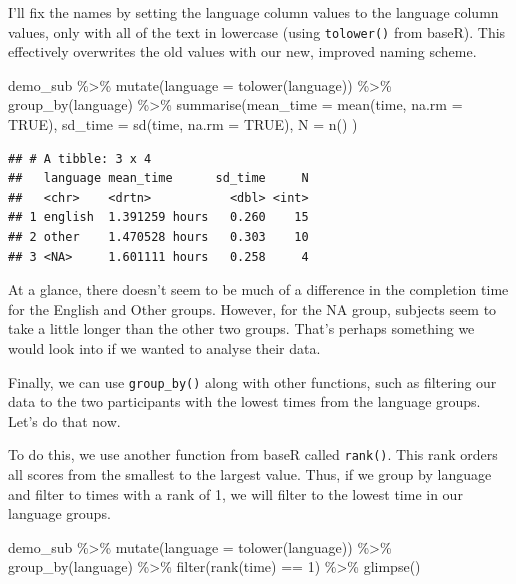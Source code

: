 \documentclass[
]{book}
\newenvironment{Shaded}{\begin{snugshade}}{\end{snugshade}}
\newcommand{\AttributeTok}[1]{\textcolor[rgb]{0.77,0.63,0.00}{#1}}
\newcommand{\ConstantTok}[1]{\textcolor[rgb]{0.00,0.00,0.00}{#1}}
\newcommand{\DecValTok}[1]{\textcolor[rgb]{0.00,0.00,0.81}{#1}}
\newcommand{\FunctionTok}[1]{\textcolor[rgb]{0.00,0.00,0.00}{#1}}
\newcommand{\NormalTok}[1]{#1}
\newcommand{\SpecialCharTok}[1]{\textcolor[rgb]{0.00,0.00,0.00}{#1}}
\begin{document}
I'll fix the names by setting the language column values to the language column values, only with all of the text in lowercase (using \texttt{tolower()} from baseR). This effectively overwrites the old values with our new, improved naming scheme.

\begin{Shaded}
\begin{Highlighting}[]
\NormalTok{demo\_sub }\SpecialCharTok{\%\textgreater{}\%} 
  \FunctionTok{mutate}\NormalTok{(}\AttributeTok{language =} \FunctionTok{tolower}\NormalTok{(language)) }\SpecialCharTok{\%\textgreater{}\%}
  \FunctionTok{group\_by}\NormalTok{(language) }\SpecialCharTok{\%\textgreater{}\%}
  \FunctionTok{summarise}\NormalTok{(}\AttributeTok{mean\_time =} \FunctionTok{mean}\NormalTok{(time, }\AttributeTok{na.rm =} \ConstantTok{TRUE}\NormalTok{),}
           \AttributeTok{sd\_time =} \FunctionTok{sd}\NormalTok{(time, }\AttributeTok{na.rm =} \ConstantTok{TRUE}\NormalTok{),}
           \AttributeTok{N =} \FunctionTok{n}\NormalTok{()}
\NormalTok{           )}
\end{Highlighting}
\end{Shaded}

\begin{verbatim}
## # A tibble: 3 x 4
##   language mean_time      sd_time     N
##   <chr>    <drtn>           <dbl> <int>
## 1 english  1.391259 hours   0.260    15
## 2 other    1.470528 hours   0.303    10
## 3 <NA>     1.601111 hours   0.258     4
\end{verbatim}

At a glance, there doesn't seem to be much of a difference in the completion time for the English and Other groups. However, for the NA group, subjects seem to take a little longer than the other two groups. That's perhaps something we would look into if we wanted to analyse their data.

Finally, we can use \texttt{group\_by()} along with other functions, such as filtering our data to the two participants with the lowest times from the language groups. Let's do that now.

To do this, we use another function from baseR called \texttt{rank()}. This rank orders all scores from the smallest to the largest value. Thus, if we group by language and filter to times with a rank of 1, we will filter to the lowest time in our language groups.

\begin{Shaded}
\begin{Highlighting}[]
\NormalTok{demo\_sub }\SpecialCharTok{\%\textgreater{}\%} 
  \FunctionTok{mutate}\NormalTok{(}\AttributeTok{language =} \FunctionTok{tolower}\NormalTok{(language)) }\SpecialCharTok{\%\textgreater{}\%}
  \FunctionTok{group\_by}\NormalTok{(language) }\SpecialCharTok{\%\textgreater{}\%}
  \FunctionTok{filter}\NormalTok{(}\FunctionTok{rank}\NormalTok{(time) }\SpecialCharTok{==} \DecValTok{1}\NormalTok{) }\SpecialCharTok{\%\textgreater{}\%}
  \FunctionTok{glimpse}\NormalTok{()}
\end{Highlighting}
\end{Shaded}
\end{document}
